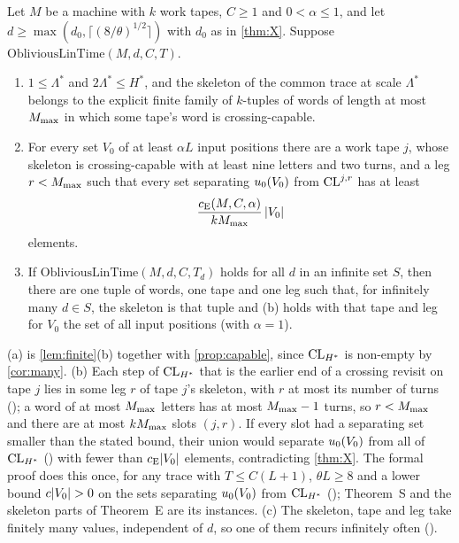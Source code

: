 \begin{theorem}\label{thm:S}
Let $M$ be a machine with $k$ work tapes, $C\ge1$ and $0<\alpha\le1$, and let $d\ge\max(d_0,\lceil(8/\theta)^{1/2}\rceil)$ with $d_0$ as in
\cref{thm:X}. Suppose $\mathrm{ObliviousLinTime}(M,d,C,T)$.
\begin{enumerate}[label=(\alph*)]
\item $1\le\Lambda^*$ and $2\Lambda^*\le H^*$, and the skeleton of the common trace at scale $\Lambda^*$ belongs to the explicit
finite family of $k$-tuples of words of length at most $M_{\max}$ in which some tape's word is crossing-capable.
\item For every set $V_0$ of at least $\alpha L$ input positions there are a work tape $j$, whose skeleton is crossing-capable
with at least nine letters and two turns, and a leg $r<M_{\max}$ such that every set separating $u_0(V_0)$ from $\mathrm{CL}^{j,r}$ has at
least
\[
  \frac{c_{\mathrm{E}}(M,C,\alpha)}{kM_{\max}}\,\lvert V_0 \rvert
\]
elements.
\item If $\mathrm{ObliviousLinTime}(M,d,C,T_d)$ holds for all $d$ in an infinite set $S$, then there are one tuple of words, one tape
and one leg such that, for infinitely many $d\in S$, the skeleton is that tuple and (b) holds with that tape and leg for $V_0$ the
set of all input positions (with $\alpha=1$).
\end{enumerate}
\end{theorem}

\begin{outline}
(a) is \cref{lem:finite}(b) together with \cref{prop:capable}, since $\mathrm{CL}_{H^*}$ is non-empty by \cref{cor:many}. (b) Each
step of $\mathrm{CL}_{H^*}$ that is the earlier end of a crossing revisit on tape $j$ lies in some leg $r$ of tape $j$'s skeleton, with $r$ at most
its number of turns (); a word of at most $M_{\max}$ letters has at most $M_{\max}-1$ turns, so $r<M_{\max}$ and
there are at most $kM_{\max}$ slots $(j,r)$. If every slot had a separating set smaller than the stated bound, their union would separate
$u_0(V_0)$ from all of $\mathrm{CL}_{H^*}$ () with fewer than $c_{\mathrm{E}}\lvert V_0 \rvert$ elements, contradicting
\cref{thm:X}. The formal proof does this once, for any trace with $T\le C(L+1)$, $\theta L\ge8$ and a lower bound $c\lvert V_0 \rvert>0$ on the
sets separating $u_0(V_0)$ from $\mathrm{CL}_{H^*}$ (); Theorem~S and
the skeleton parts of Theorem~E are its instances. (c) The skeleton,
tape and leg take finitely many values, independent of $d$, so one of them recurs infinitely often
().
\end{outline}

